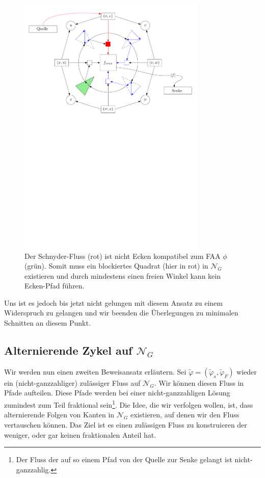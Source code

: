 \begin{figure}
	\centering
  	\includegraphics[width=0.8\textwidth]{combined_face_not_corner.pdf}
  	\caption{Der Schnyder-Fluss (rot) ist nicht Ecken kompatibel zum FAA $\phi$ (grün). Somit muss ein blockiertes Quadrat (hier in rot) in $\mathcal{N}_G$ existieren und durch mindestens einen freien Winkel kann kein Ecken-Pfad führen.}
	\label{combined_face_not_corner}
\end{figure}

Uns ist es jedoch bis jetzt nicht gelungen mit diesem Ansatz zu einem Widerspruch zu gelangen und wir beenden die Überlegungen zu minimalen Schnitten an diesem Punkt.

\subsection{Alternierende Zykel auf $\mathcal{N}_G$}

Wir werden nun einen zweiten Beweisansatz erläutern. Sei $\tilde{\varphi}=(\tilde{\varphi}_s,\tilde{\varphi}_F)$ wieder ein (nicht-ganzzahliger) zulässiger Fluss auf $\mathcal{N}_G$. Wir können diesen Fluss in Pfade aufteilen. Diese Pfade werden bei einer nicht-ganzzahligen Lösung zumindest zum Teil fraktional sein\footnote{Der Fluss der auf so einem Pfad von der Quelle zur Senke gelangt ist nicht-ganzzahlig.}. Die Idee, die wir verfolgen wollen, ist, dass alternierende Folgen von Kanten in $\mathcal{N}_G$ existieren, auf denen wir den Fluss vertauschen können. Das Ziel ist es einen zulässigen Fluss zu konstruieren der weniger, oder gar keinen fraktionalen Anteil hat.

